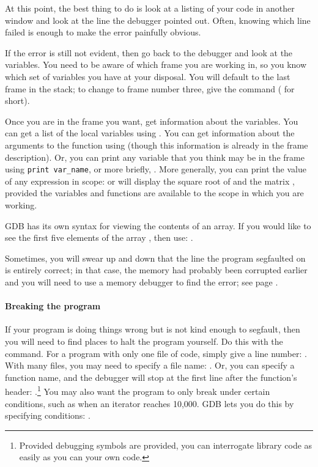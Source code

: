 At this point, the best thing to do is look at a listing of your code
in another window and look at the line the debugger pointed out. Often,
knowing which line failed is enough to make the error painfully obvious.


If the error is still not evident, then go back to the debugger and look
at the variables. You need to be aware of which frame you are working in,
so you know which set of variables you have at your disposal.  You
will default to the last frame in the stack; to change to frame number
three, give the command  ( for short).

Once you are in the frame you want, get information about the
variables. You can get a list of the local variables using . You can get information about the arguments to the function
using  (though this information is already in the frame
description). Or, you can print any variable that you think may be in the
frame using {\tt print var\_name}, or more briefly, .
More generally, you can print the value of any expression in scope:
 or  will display the square
root of  and the matrix , provided the variables and
functions are available to the scope in which you are working.

GDB has its own syntax for viewing the contents of an array. If you
would like to see the first five elements of the array ,
then use: .

Sometimes, you will swear up and down that the line the program segfaulted on is
entirely correct; in that case, the memory had probably been corrupted
earlier and you will need to use a memory debugger to find the error;
see page \pageref{valgrind}.

\paragraph{Breaking the program} If your program is doing things wrong but is not kind
enough to segfault, then you will need to find places to halt the program
yourself. Do this with the  command. For a program with only
one file of code, simply give a line number: . With many
files, you may need to specify a file name: . Or,
you can specify a function name, and the debugger will stop at the first line
after the function's header: .\footnote{Provided debugging symbols are
provided, you can interrogate library code as easily as you can your own code.}
You
may also want the program to only break under certain conditions, such
as when an iterator reaches 10,000. GDB lets you do this by specifying
conditions: .

